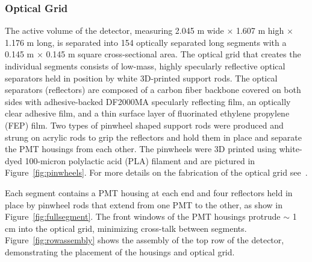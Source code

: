 \subsubsection{Optical Grid}

The active volume of the detector, measuring 2.045 m wide $\times$ 1.607 m high $\times$ 1.176 m long, is separated into 154 optically separated long segments with a 0.145 m $\times$ 0.145 m square cross-sectional area. 
The optical grid that creates the individual segments consists of low-mass, highly specularly reflective optical separators held in position by white 3D-printed support rods. 
The optical separators (reflectors) are composed of a carbon fiber backbone covered on both sides with adhesive-backed DF2000MA specularly reflecting film, an optically clear adhesive film, and a thin surface layer of fluorinated ethylene propylene (FEP) film.
Two types of pinwheel shaped support rods were produced and strung on acrylic rods to grip the reflectors and hold them in place and separate the PMT housings from each other.
The pinwheels were 3D printed using white-dyed 100-micron polylactic acid (PLA) filament and are pictured in Figure~\ref{fig:pinwheels}.
For more details on the fabrication of the optical grid see~\cite{Ashenfelter:2019lbf}.

Each segment contains a PMT housing at each end and four reflectors held in place by pinwheel rods that extend from one PMT to the other, as show in Figure~\ref{fig:fullsegment}.
The front windows of the PMT housings protrude $\sim$ 1 cm into the optical grid, minimizing cross-talk 
between segments. 
Figure~\ref{fig:rowassembly} shows the assembly of the top row of the detector, demonstrating the placement of the housings and optical grid. 


